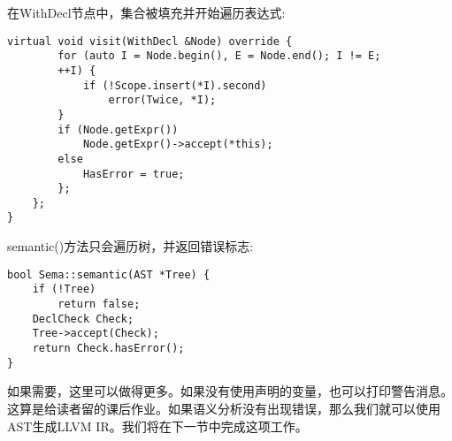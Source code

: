 在WithDecl节点中，集合被填充并开始遍历表达式:

\begin{lstlisting}[caption={}]
	virtual void visit(WithDecl &Node) override {
		for (auto I = Node.begin(), E = Node.end(); I != E;
		++I) {
			if (!Scope.insert(*I).second)
				error(Twice, *I);
		}
		if (Node.getExpr())
			Node.getExpr()->accept(*this);
		else
			HasError = true;
		};
	};
}
\end{lstlisting}

semantic()方法只会遍历树，并返回错误标志:

\begin{lstlisting}[caption={}]
bool Sema::semantic(AST *Tree) {
	if (!Tree)
		return false;
	DeclCheck Check;
	Tree->accept(Check);
	return Check.hasError();
}
\end{lstlisting}

如果需要，这里可以做得更多。如果没有使用声明的变量，也可以打印警告消息。这算是给读者留的课后作业。如果语义分析没有出现错误，那么我们就可以使用AST生成LLVM IR。我们将在下一节中完成这项工作。\par




























